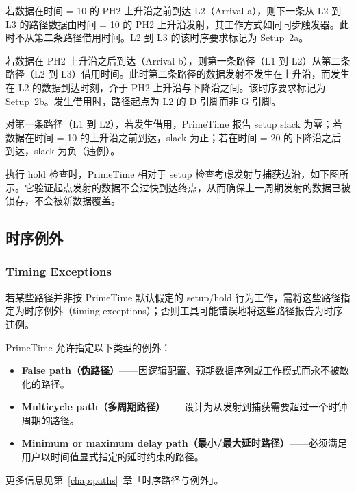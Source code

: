 若数据在时间 = 10 的 PH2 上升沿之前到达 L2（Arrival a），则下一条从 L2 到 L3 的路径数据由时间 = 10 的 PH2 上升沿发射，其工作方式如同同步触发器。此时不从第二条路径借用时间。L2 到 L3 的该时序要求标记为 Setup~2a。

若数据在 PH2 上升沿之后到达（Arrival b），则第一条路径（L1 到 L2）从第二条路径（L2 到 L3）借用时间。此时第二条路径的数据发射不发生在上升沿，而发生在 L2 的数据到达时刻，介于 PH2 上升沿与下降沿之间。该时序要求标记为 Setup~2b。发生借用时，路径起点为 L2 的 D 引脚而非 G 引脚。

对第一条路径（L1 到 L2），若发生借用，PrimeTime 报告 setup slack 为零；若数据在时间 = 10 的上升沿之前到达，slack 为正；若在时间 = 20 的下降沿之后到达，slack 为负（违例）。

执行 hold 检查时，PrimeTime 相对于 setup 检查考虑发射与捕获边沿，如下图所示。它验证起点发射的数据不会过快到达终点，从而确保上一周期发射的数据已被锁存，不会被新数据覆盖。


\subsection{时序例外}
\subsubsection*{Timing Exceptions}

若某些路径并非按 PrimeTime 默认假定的 setup/hold 行为工作，需将这些路径指定为时序例外（timing exceptions）；否则工具可能错误地将这些路径报告为时序违例。

PrimeTime 允许指定以下类型的例外：
\begin{itemize}
  \item \textbf{False path（伪路径）}——因逻辑配置、预期数据序列或工作模式而永不被敏化的路径。
  \item \textbf{Multicycle path（多周期路径）}——设计为从发射到捕获需要超过一个时钟周期的路径。
  \item \textbf{Minimum or maximum delay path（最小/最大延时路径）}——必须满足用户以时间值显式指定的延时约束的路径。
\end{itemize}

更多信息见第~\ref{chap:paths}~章「时序路径与例外」。
